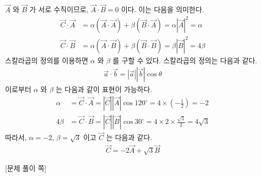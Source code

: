 \documentclass[APS,floatfix,nofootinbib,superscriptaddress,fleqn,preprint]{revtex4}
\begin{document}
 $\vec{A}$ 와 $\vec{B}$ 가 서로 수직이므로, $\vec{A} \cdot \vec{B} =0 $ 이다. 이는 다음을 의미한다.
\begin{align*}
  \vec{C} \cdot \vec{A} &= \alpha(\vec{A}\cdot\vec{A})+\beta(\vec{B}\cdot\vec{A}) = \alpha|\vec{A}|^2=\alpha \\
  \vec{C} \cdot \vec{B} &= \alpha(\vec{A}\cdot\vec{B})+\beta(\vec{B}\cdot\vec{B}) =\beta|\vec{B}|^2=4\beta 
\end{align*}
스칼라곱의 정의를 이용하면 $\alpha$ 와 $\beta$ 를 구할 수 있다. 스칼라곱의 정의는 다음과 같다.
\begin{align*}
  \vec{a} \cdot \vec{b} = |\vec{a}||\vec{b}|\cos{\theta}
\end{align*}
이로부터 $\alpha$ 와 $\beta$ 는 다음과 같이 표현이 가능하다.
\begin{align*}
  \alpha &= \vec{C} \cdot \vec{A} =|\vec{C}||\vec{A}|\cos{120^{\circ}} = 4 \times \left(-\frac{1}{2}\right) = -2 \\
  4\beta &= \vec{C} \cdot \vec{B} =|\vec{C}||\vec{B}|\cos{30^{\circ}} = 4 \times 2 \times \frac{\sqrt{3}}{2} = 4\sqrt{3}
\end{align*}
따라서, $\alpha = -2$, $\beta = \sqrt{3}$ 이고 $\vec{C}$ 는 다음과 같다.
\begin{align*}
  \vec{C} = -2 \vec{A} + \sqrt{3} \vec{B}
\end{align*}
\newpage

{\color{gray} [문제 풀이 쪽]}

\newpage 
\end{document}
